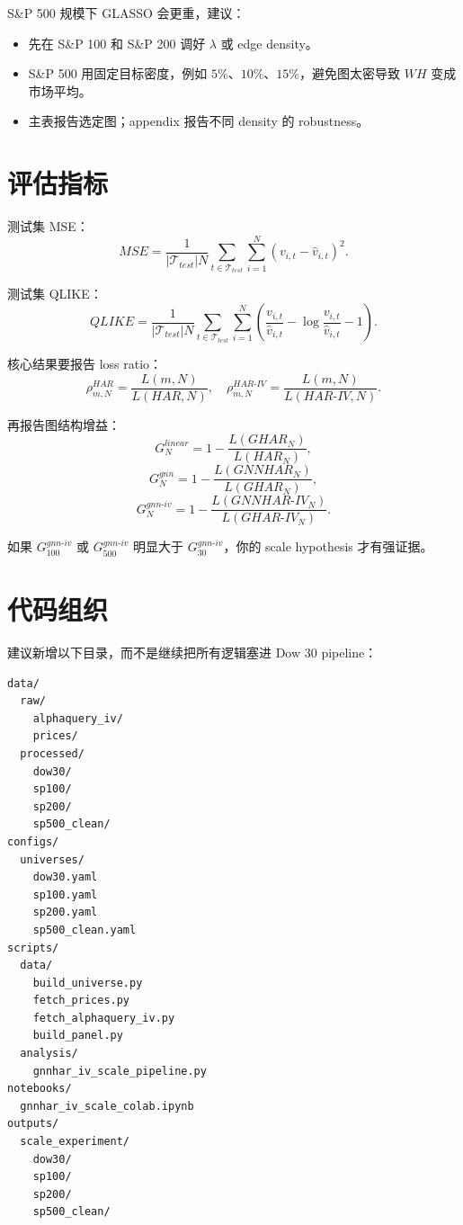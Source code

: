 \documentclass[11pt,a4paper]{ctexart}
\begin{document}
S\&P 500 规模下 GLASSO 会更重，建议：

\begin{itemize}[leftmargin=*]
\item 先在 S\&P 100 和 S\&P 200 调好 \(\lambda\) 或 edge density。
\item S\&P 500 用固定目标密度，例如 \(5\%\)、\(10\%\)、\(15\%\)，避免图太密导致 \(WH\) 变成市场平均。
\item 主表报告选定图；appendix 报告不同 density 的 robustness。
\end{itemize}

\section{评估指标}

测试集 MSE：
\[
MSE
=
\frac{1}{|\mathcal{T}_{test}|N}
\sum_{t\in \mathcal{T}_{test}}\sum_{i=1}^{N}
(v_{i,t}-\widehat v_{i,t})^2.
\]

测试集 QLIKE：
\[
QLIKE
=
\frac{1}{|\mathcal{T}_{test}|N}
\sum_{t\in \mathcal{T}_{test}}\sum_{i=1}^{N}
\left(
\frac{v_{i,t}}{\widehat v_{i,t}}
-\log\frac{v_{i,t}}{\widehat v_{i,t}}-1
\right).
\]

核心结果要报告 loss ratio：
\[
\rho_{m,N}^{HAR}=\frac{L(m,N)}{L(HAR,N)},
\quad
\rho_{m,N}^{HAR\text{-}IV}=\frac{L(m,N)}{L(HAR\text{-}IV,N)}.
\]

再报告图结构增益：
\[
G^{linear}_N
=
1-\frac{L(GHAR_N)}{L(HAR_N)},
\]
\[
G^{gnn}_N
=
1-\frac{L(GNNHAR_N)}{L(GHAR_N)},
\]
\[
G^{gnn\text{-}iv}_N
=
1-\frac{L(GNNHAR\text{-}IV_N)}{L(GHAR\text{-}IV_N)}.
\]

如果 \(G^{gnn\text{-}iv}_{100}\) 或 \(G^{gnn\text{-}iv}_{500}\) 明显大于 \(G^{gnn\text{-}iv}_{30}\)，你的 scale hypothesis 才有强证据。

\section{代码组织}

建议新增以下目录，而不是继续把所有逻辑塞进 Dow 30 pipeline：

\begin{lstlisting}
data/
  raw/
    alphaquery_iv/
    prices/
  processed/
    dow30/
    sp100/
    sp200/
    sp500_clean/
configs/
  universes/
    dow30.yaml
    sp100.yaml
    sp200.yaml
    sp500_clean.yaml
scripts/
  data/
    build_universe.py
    fetch_prices.py
    fetch_alphaquery_iv.py
    build_panel.py
  analysis/
    gnnhar_iv_scale_pipeline.py
notebooks/
  gnnhar_iv_scale_colab.ipynb
outputs/
  scale_experiment/
    dow30/
    sp100/
    sp200/
    sp500_clean/
\end{lstlisting}
\end{document}
